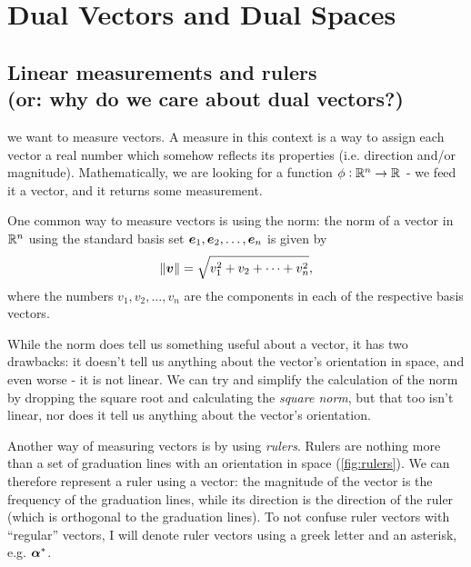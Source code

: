 \section{Dual Vectors and Dual Spaces}

\subsection{Linear measurements and rulers\\(or: why do we care about dual vectors?)}
 we want to measure vectors. A measure in this context is a way to assign each vector a real number which somehow reflects its properties (i.e. direction and/or magnitude). Mathematically, we are looking for a function $\phi:\Rs[n]\to\Rs$ - we feed it a vector, and it returns some measurement.

One common way to measure vectors is using the norm: the norm of a vector in $\Rs[n]$ using the standard basis set $\eb{1},\eb{2},\dots,\eb{n}$ is given by
\begin{equation}
    \vnorm{v} = \sqrt{v_{1}^{2}+v_{2}+\dots+v_{n}^{2}},
    \label{eq:std_norm}
\end{equation}
where the numbers $v_{1},v_{2},\dots,v_{n}$ are the components in each of the respective basis vectors.

While the norm does tell us something useful about a vector, it has two drawbacks: it doesn't tell us anything about the vector's orientation in space, and even worse - it is not linear. We can try and simplify the calculation of the norm by dropping the square root and calculating the \textit{square norm}, but that too isn't linear, nor does it tell us anything about the vector's orientation.

Another way of measuring vectors is by using \textit{rulers}. Rulers are nothing more than a set of graduation lines with an orientation in space (\cref{fig:rulers}). We can therefore represent a ruler using a vector: the magnitude of the vector is the frequency of the graduation lines, while its direction is the direction of the ruler (which is orthogonal to the graduation lines). To not confuse ruler vectors with \enquote{regular} vectors, I will denote ruler vectors using a greek letter and an asterisk, e.g. $\dualvec{\alpha}$.

